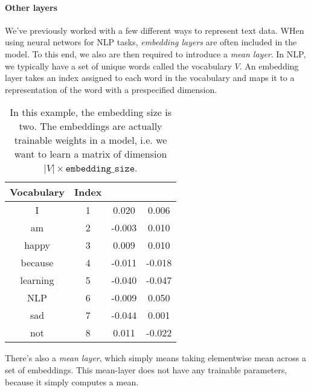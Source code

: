 \documentclass[12pt]{article}
\begin{document}
\paragraph{Other layers}
We've previously worked with a few different ways to represent text data. WHen using neural networs for NLP tasks, \emph{embedding layers} are often included in the model. To this end, we also are then required to introduce a \emph{mean layer}. In NLP, we typically have a set of unique words called the vocabulary $V$. An embedding layer takes an index assigned to each word in the vocabulary and maps it to a representation of the word with a prespecified dimension.

\begin{table}[h]
  \begin{center}
    \begin{tabular}{c c c c}
      \hline
      Vocabulary & Index & & \\
      \hline
      I & 1 & 0.020 & 0.006 \\
      am & 2 & -0.003 & 0.010 \\ 
      happy & 3 & 0.009 & 0.010 \\
      because & 4 & -0.011 & -0.018 \\
      learning & 5 & -0.040 & -0.047 \\
      NLP & 6 & -0.009 & 0.050 \\
      sad & 7 & -0.044 & 0.001 \\
      not & 8 & 0.011 & -0.022 \\
      \hline
    \end{tabular}
    \caption{In this example, the embedding size is two. The embeddings are actually trainable weights in a model, i.e. we want to learn a matrix of dimension $|V| \times \texttt{embedding\_size}$.}
  \end{center}
\end{table}

There's also a \emph{mean layer}, which simply means taking elementwise mean across a set of embeddings. This mean-layer does not have any trainable parameters, because it simply computes a mean.
\end{document}
